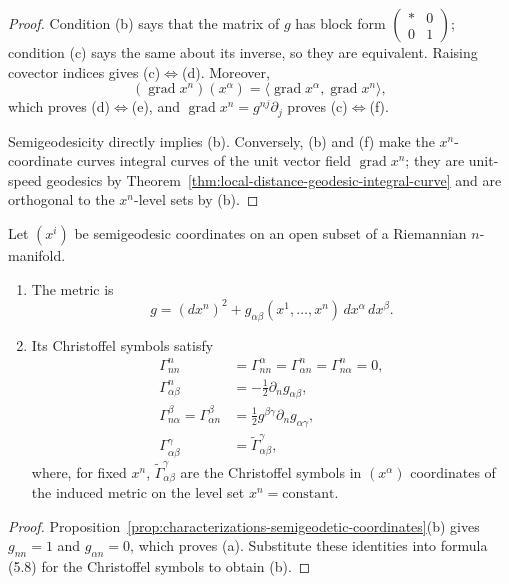 \begin{proof}
\sketch Condition (b) says that the matrix of $g$ has block form
$\left(\begin{smallmatrix} *&0\\0&1\end{smallmatrix}\right)$; condition (c)
says the same about its inverse, so they are equivalent. Raising covector
indices gives (c)$\Leftrightarrow$(d). Moreover,
\[
(\operatorname{grad}x^n)(x^\alpha)
=\langle\operatorname{grad}x^\alpha,\operatorname{grad}x^n\rangle,
\]
which proves (d)$\Leftrightarrow$(e), and
$\operatorname{grad}x^n=g^{nj}\partial_j$ proves
(c)$\Leftrightarrow$(f).

Semigeodesicity directly implies (b). Conversely, (b) and (f) make the
$x^n$-coordinate curves integral curves of the unit vector field
$\operatorname{grad}x^n$; they are unit-speed geodesics by
Theorem~\ref{thm:local-distance-geodesic-integral-curve} and are orthogonal to
the $x^n$-level sets by (b).
\end{proof}

\begin{corollary}
\label{cor:semigeodesic-metric-christoffel}

Let $(x^i)$ be semigeodesic coordinates on an open subset of a Riemannian
$n$-manifold.
\begin{enumerate}
\item[(a)] The metric is
\[
g=(dx^n)^2+g_{\alpha\beta}(x^1,\ldots,x^n)\,dx^\alpha\,dx^\beta.
\]
\item[(b)] Its Christoffel symbols satisfy
\begin{align*}
\Gamma^n_{nn}&=\Gamma^\alpha_{nn}=\Gamma^n_{\alpha n}
=\Gamma^n_{n\alpha}=0,\\
\Gamma^n_{\alpha\beta}&=-\frac12\partial_ng_{\alpha\beta},\\
\Gamma^\beta_{n\alpha}=\Gamma^\beta_{\alpha n}
&=\frac12g^{\beta\gamma}\partial_ng_{\alpha\gamma},\\
\Gamma^\gamma_{\alpha\beta}&=\widetilde\Gamma^\gamma_{\alpha\beta},
\end{align*}
where, for fixed $x^n$, $\widetilde\Gamma^\gamma_{\alpha\beta}$ are the
Christoffel symbols in $(x^\alpha)$ coordinates of the induced metric on the
level set $x^n=\text{constant}$.
\end{enumerate}
\end{corollary}

\begin{proof}
\sketch Proposition~\ref{prop:characterizations-semigeodetic-coordinates}(b)
gives $g_{nn}=1$ and $g_{\alpha n}=0$, which proves (a). Substitute these
identities into formula (5.8) for the Christoffel symbols to obtain (b).
\end{proof}

